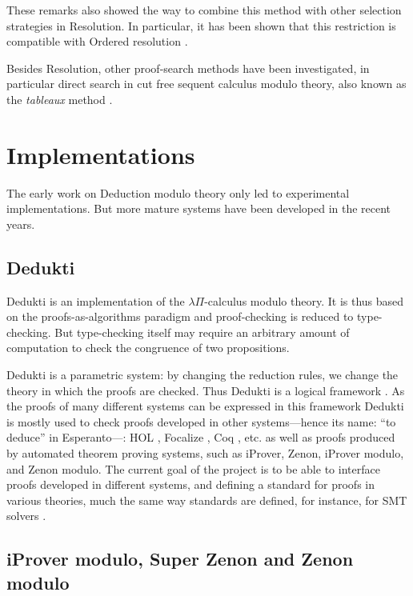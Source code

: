 \documentclass{llncs}
\begin{document}
These remarks also showed the way to combine this method with other
selection strategies in Resolution. In particular, it has been shown
that this restriction is compatible with Ordered resolution
\cite{Burel10}.

Besides Resolution, other proof-search methods have been investigated, 
in particular direct search in cut free sequent calculus modulo theory, 
also known as the {\em tableaux} method \cite{BonichonHermant}.

\section{Implementations}

The early work on Deduction modulo theory only led to experimental 
implementations. But more mature systems have been developed in the 
recent years.

\subsection{Dedukti}

Dedukti \cite{Boespflug,BCH,Saillard} 
is an implementation of the $\lambda\Pi$-calculus modulo
theory.  It is thus based on the proofs-as-algorithms paradigm and
proof-checking is reduced to type-checking. But type-checking itself
may require an arbitrary amount of computation to check the congruence
of two propositions.

Dedukti is a parametric system: by changing the reduction rules, we
change the theory in which the proofs are checked. Thus Dedukti is a
logical framework \cite{HHP}. As the proofs of many different systems
can be expressed in this framework Dedukti is mostly used to check
proofs developed in other systems---hence its name: ``to deduce'' in
Esperanto---: HOL \cite{Assafmaster}, Focalize \cite{Cauderlier}, Coq
\cite{BoespflugBurel,Assaf}, etc. as well as proofs produced by
automated theorem proving systems, such as iProver, Zenon, iProver
modulo, and Zenon modulo.  The current goal of the project is to be
able to interface proofs developed in different systems, and defining
a standard for proofs in various theories, much the same way standards
are defined, for instance, for SMT solvers
\cite{BessonFontaineThery,StumpOeReynoldsHarareanTinelli}.

\subsection{iProver modulo, Super Zenon and Zenon modulo}
\end{document}
